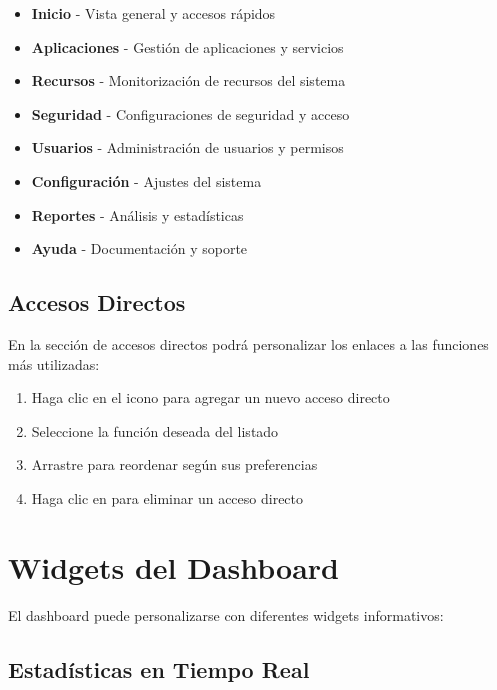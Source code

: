 \begin{itemize}
    \item {} \textbf{Inicio} - Vista general y accesos rápidos
    \item {} \textbf{Aplicaciones} - Gestión de aplicaciones y servicios
    \item {} \textbf{Recursos} - Monitorización de recursos del sistema
    \item {} \textbf{Seguridad} - Configuraciones de seguridad y acceso
    \item {} \textbf{Usuarios} - Administración de usuarios y permisos
    \item {} \textbf{Configuración} - Ajustes del sistema
    \item {} \textbf{Reportes} - Análisis y estadísticas
    \item {} \textbf{Ayuda} - Documentación y soporte
\end{itemize}

\subsection{Accesos Directos}

En la sección de accesos directos podrá personalizar los enlaces a las funciones más utilizadas:

\begin{enumerate}
    \item Haga clic en el icono  para agregar un nuevo acceso directo
    \item Seleccione la función deseada del listado
    \item Arrastre para reordenar según sus preferencias
    \item Haga clic en  para eliminar un acceso directo
\end{enumerate}

\section{Widgets del Dashboard}

El dashboard puede personalizarse con diferentes widgets informativos:

\subsection{Estadísticas en Tiempo Real}

